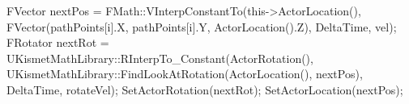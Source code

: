 \begin{listing}[language=C++, caption=Movement logic for the pathfinding algorithm, frame=single, label=code:movementLogic]
	FVector nextPos = FMath::VInterpConstantTo(this->ActorLocation(), FVector(pathPoints[i].X, pathPoints[i].Y, ActorLocation().Z), DeltaTime, vel);
	FRotator nextRot = UKismetMathLibrary::RInterpTo_Constant(ActorRotation(), UKismetMathLibrary::FindLookAtRotation(ActorLocation(), nextPos), DeltaTime, rotateVel);
	SetActorRotation(nextRot);
	SetActorLocation(nextPos);
\end{listing}